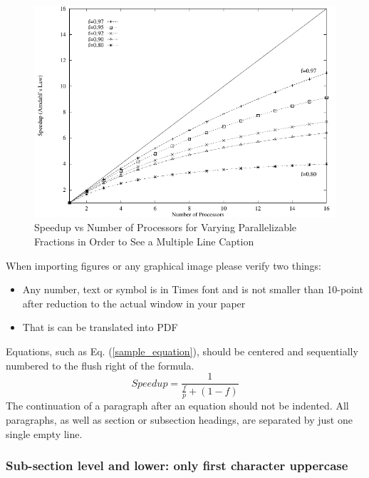 \documentclass{ansconf}
\begin{document}
%
\vspace{16pt}
\begin{figure}[!htb]
\begin{spacing}{1.0}
\centering
\includegraphics[scale=0.60]{figure}
\caption{Speedup vs Number of Processors for Varying Parallelizable Fractions in
  Order to See a Multiple Line Caption}
\label{fig:amdahl}
\end{spacing}
\end{figure}
\vspace{16pt}
%

When importing figures or any graphical image please verify two things:
\begin{itemize}
\item Any number, text or symbol is in Times font and is not smaller than
    10-point after reduction to the actual window in your paper
\item That is can be translated into PDF
\end{itemize}


Equations, such as Eq. (\ref{sample_equation}), should be centered and
sequentially numbered to the flush right of the formula.
\begin{equation}
  \label{sample_equation}
  Speedup = \frac{1}{\frac{f}{p} + (1-f)}
\end{equation}
The continuation of a paragraph after an equation should not be indented.
All paragraphs, as well as section or subsection headings, are separated by
just one single empty line.


\subsubsection{Sub-section level and lower: only first character uppercase}
\end{document}
